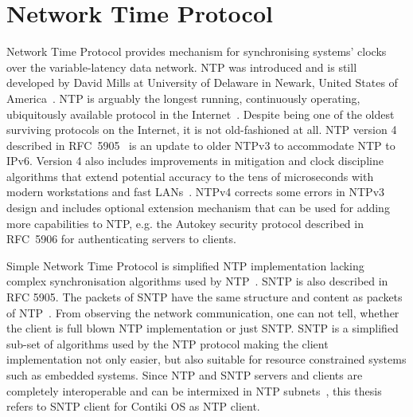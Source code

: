 
\chapter{Network Time Protocol}
Network Time Protocol provides mechanism for synchronising systems' clocks over the variable-latency data network.
NTP was introduced and is still developed by
David Mills at University of Delaware in Newark, United States of America~\cite{ntp-history}.
NTP is arguably the longest running, continuously operating,
ubiquitously available protocol in the Internet~\cite{ntp-overview}.
Despite being one of the oldest surviving protocols on the Internet, it is not old-fashioned at all.
NTP version 4 described in RFC~5905~\cite{rfc5905} is an update to older NTPv3 to accommodate NTP to IPv6.
Version 4 also includes improvements in
mitigation and clock discipline algorithms that extend
potential accuracy to the tens of microseconds with modern
workstations and fast LANs~\cite{rfc5905}.
NTPv4 corrects some
errors in NTPv3 design and includes optional extension mechanism
that can be used for adding more capabilities to NTP, e.g. the
Autokey security protocol described in RFC~5906
for authenticating servers to clients.

Simple Network Time Protocol is simplified NTP implementation lacking complex
synchronisation algorithms used by NTP~\cite{rfc5905}.
SNTP is also described in RFC 5905.
The packets of SNTP have the same structure and content as packets of NTP~\cite{rfc5905}.
From observing the network communication, one can not tell, whether the client
is full blown NTP implementation or just SNTP.
SNTP is a simplified sub-set of algorithms used by the NTP protocol
making the client implementation not only easier, but also suitable for
resource constrained systems such as embedded systems.
Since NTP and SNTP servers and clients are
completely interoperable and can be intermixed in NTP subnets~\cite{rfc5905},
this thesis refers to SNTP client for Contiki OS as NTP client.










